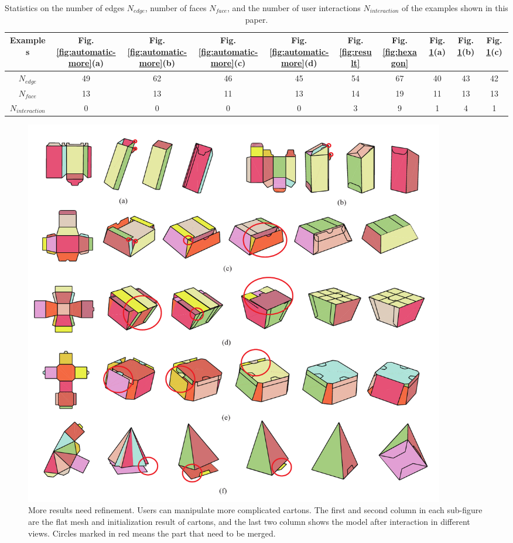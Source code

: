 \begin{table}
	\centering
	\caption{Statistics on the number of edges $N_{edge}$, number of faces $N_{face}$, and the number of user interactions $N_{interaction}$ of the examples shown in this paper.}
	\begin{tabular}{c|ccccccccc}
		\hline
		Examples & Fig.\ref{fig:automatic-more}(a) & Fig.\ref{fig:automatic-more}(b) &  Fig.\ref{fig:automatic-more}(c) & Fig.\ref{fig:automatic-more}(d) & Fig.\ref{fig:result} & Fig.\ref{fig:hexagon} & Fig.\ref{fig:result-more}(a) & Fig.\ref{fig:result-more}(b)& Fig.\ref{fig:result-more}(c)\\
		\hline
		$N_{edge}$ & 49 & 62 & 46 & 45 & 54 & 67 & 40 & 43 & 42 \\
		$N_{face}$  & 13 & 13 & 11 & 13 & 14 & 19 & 11 & 13 & 13 \\
		$N_{interaction}$  & 0 & 0 & 0 & 0 & 3 & 9 & 1 & 4 & 1\\ 
		\hline
		\end{tabular}
		\label{table:statistics}
\end{table}



\begin{figure}
	\centering
	\includegraphics[width=0.9\textwidth]{images/newMore}
	\caption{More results need refinement. Users can manipulate more complicated cartons. The first and second column in each sub-figure are the flat mesh and initialization result of cartons, and the last two column shows the model after interaction in  different views. Circles marked in red means the part that need to be merged.}
	\label{fig:result-more}
\end{figure}